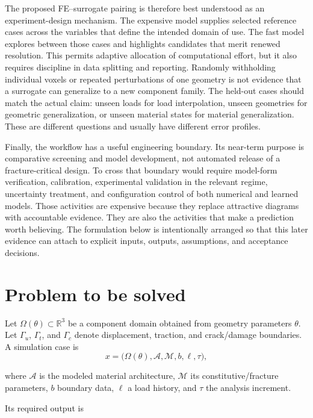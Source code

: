\documentclass[11pt]{article}
\begin{document}
The proposed FE--surrogate pairing is therefore best understood as an
experiment-design mechanism.  The expensive model supplies selected reference
cases across the variables that define the intended domain of use.  The fast
model explores between those cases and highlights candidates that merit renewed
resolution.  This permits adaptive allocation of computational effort, but it
also requires discipline in data splitting and reporting.  Randomly withholding
individual voxels or repeated perturbations of one geometry is not evidence that
a surrogate can generalize to a new component family.  The held-out cases should
match the actual claim: unseen loads for load interpolation, unseen geometries
for geometric generalization, or unseen material states for material
generalization.  These are different questions and usually have different error
profiles.

Finally, the workflow has a useful engineering boundary.  Its near-term purpose
is comparative screening and model development, not automated release of a
fracture-critical design.  To cross that boundary would require model-form
verification, calibration, experimental validation in the relevant regime,
uncertainty treatment, and configuration control of both numerical and learned
models.  Those activities are expensive because they replace attractive diagrams
with accountable evidence.  They are also the activities that make a prediction
worth believing.  The formulation below is intentionally arranged so that this
later evidence can attach to explicit inputs, outputs, assumptions, and
acceptance decisions.

\section{Problem to be solved}

Let $\Omega(\theta)\subset\mathbb{R}^3$ be a component domain obtained from
geometry parameters $\theta$.  Let $\Gamma_u$, $\Gamma_t$, and $\Gamma_c$
denote displacement, traction, and crack/damage boundaries.  A simulation case
is
\begin{equation}
 x=\bigl(\Omega(\theta),\mathcal{A},\mathcal{M},b,\ell,\tau\bigr),
\end{equation}

where $\mathcal{A}$ is the modeled material architecture, $\mathcal{M}$ its
constitutive/fracture parameters, $b$ boundary data, $\ell$ a load history, and
$\tau$ the analysis increment.

Its required output is
\end{document}
